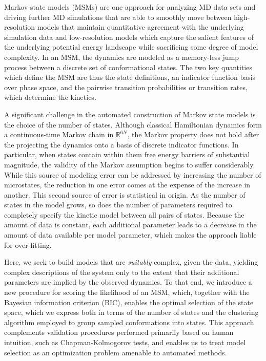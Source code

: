 \documentclass[twocolumn,floatfix,nofootinbib,aps]{revtex4-1}
\begin{document}
Markov state models (MSMs) are one approach for analyzing MD data sets and driving further MD simulations that are able to smoothly move between high-resolution models that maintain quantitative agreement with the underlying simulation data and low-resolution models which capture the salient features of the underlying potential energy landscape while sacrificing some degree of model complexity. In an MSM, the dynamics are modeled as a memory-less jump process between a discrete set of conformational states. The two key quantities which define the MSM are thus the state definitions, an indicator function basis over phase space, and the pairwise transition probabilities or transition rates, which determine the kinetics.

A significant challenge in the automated construction of Markov state
models is the choice of the number of states. Although classical Hamiltonian dynamics form a continuous-time Markov chain in $\mathbb{R}^{6N}$, the Markov property does not hold after the projecting the dynamics onto a basis of discrete indicator functions. In particular, when states contain within them free energy barriers of substantial magnitude, the validity of the Markov assumption begins to suffer considerably. While this source of modeling error can be addressed by increasing the number of microstates, the reduction in one error comes at the expense of the increase in another. This second source of error is statistical in origin. As the number of states in the model grows, so does the number of parameters required to completely specify the kinetic model between all pairs of states. Because the amount of data is constant, each additional parameter leads to a decrease in the amount of data available per model parameter, which makes the approach liable for over-fitting.

Here, we seek to build models that are \emph{suitably} complex, given the data, yielding complex descriptions of the system only to the extent that their additional parameters are implied by the observed dynamics. To that end, we introduce a new procedure for scoring the likelihood of an MSM, which, together with the Bayesian information criterion (BIC), enables the optimal selection of the state space, which we express both in terms of the number of states and the clustering algorithm employed to group sampled conformations into states. This approach complements validation procedures performed primarily based on human intuition, such as Chapman-Kolmogorov tests, and enables us to treat model selection as an optimization problem amenable to automated methods.
\end{document}
